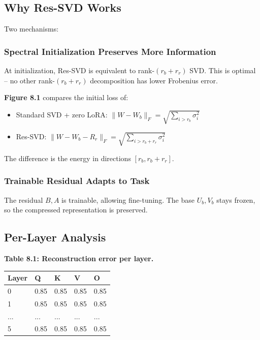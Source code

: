 \subsection{Why Res-SVD Works}

Two mechanisms:

\subsubsection{Spectral Initialization Preserves More Information}

At initialization, Res-SVD is equivalent to rank-$(r_b + r_r)$ SVD. This 
is optimal -- no other rank-$(r_b + r_r)$ decomposition has lower Frobenius 
error.

\textbf{Figure 8.1} compares the initial loss of:
\begin{itemize}
\item Standard SVD + zero LoRA: $\|W - W_b\|_F = \sqrt{\sum_{i > r_b} \sigma_i^2}$
\item Res-SVD: $\|W - W_b - R_r\|_F = \sqrt{\sum_{i > r_b + r_r} \sigma_i^2}$

\end{itemize}
The difference is the energy in directions $[r_b, r_b + r_r]$.

\subsubsection{Trainable Residual Adapts to Task}

The residual $B, A$ is trainable, allowing fine-tuning. The base 
$U_b, V_b$ stays frozen, so the compressed representation is preserved.

\subsection{Per-Layer Analysis}

\textbf{Table 8.1: Reconstruction error per layer.}

\begin{table}[H]
\centering
\small
\begin{tabular}{lllll}
\toprule
\textbf{Layer} & \textbf{Q} & \textbf{K} & \textbf{V} & \textbf{O} \\
\midrule
0 & 0.85 & 0.85 & 0.85 & 0.85 \\
1 & 0.85 & 0.85 & 0.85 & 0.85 \\
... & ... & ... & ... & ... \\
5 & 0.85 & 0.85 & 0.85 & 0.85 \\
\bottomrule
\end{tabular}
\end{table}

